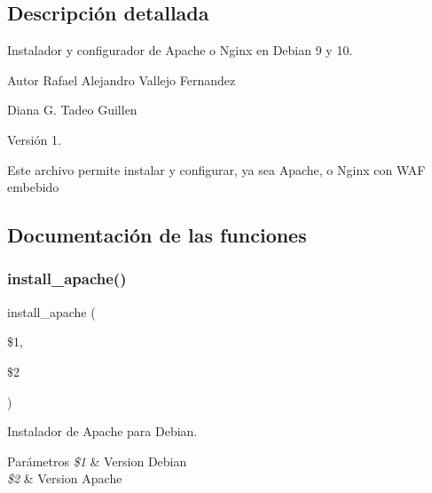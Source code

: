 \subsection{Descripción detallada}
Instalador y configurador de Apache o Nginx en Debian 9 y 10. 

\begin{DoxyAuthor}{Autor}
Rafael Alejandro Vallejo Fernandez 

Diana G. Tadeo Guillen 
\end{DoxyAuthor}
\begin{DoxyVersion}{Versión}
1.
\end{DoxyVersion}
Este archivo permite instalar y configurar, ya sea Apache, o Nginx con W\+AF embebido 

\subsection{Documentación de las funciones}
\mbox{\label{Apache__Nginx__Debian_8sh_afafab8b1f22260753bb8a28972ad9fa5}} 
\subsubsection{\texorpdfstring{install\+\_\+apache()}{install\_apache()}}
{\footnotesize\ttfamily install\+\_\+apache (\begin{DoxyParamCaption}\item[{}]{\$1,  }\item[{}]{\$2 }\end{DoxyParamCaption})}



Instalador de Apache para Debian. 


\begin{DoxyParams}{Parámetros}
{\em \$1} & Version Debian \\
\hline
{\em \$2} & Version Apache \\
\hline
\end{DoxyParams}
\mbox{\label{Apache__Nginx__Debian_8sh_a20b3bf0e3172e66928d551f5ab8cfac4}} 
